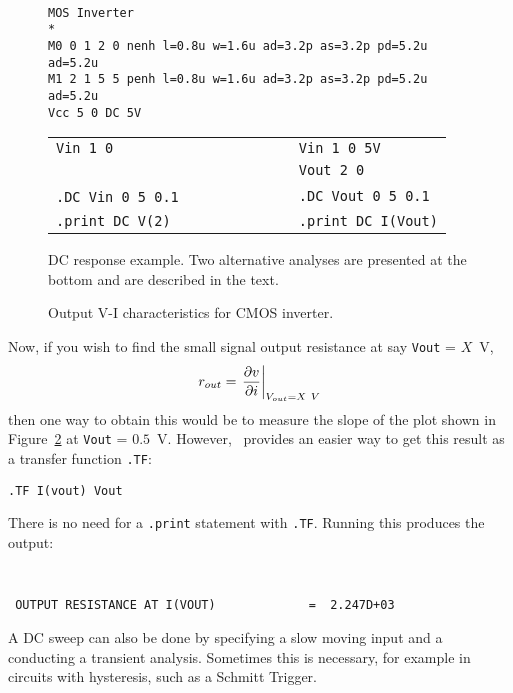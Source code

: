 \begin{figure}
\begin{center}
\par\noindent
{}
\par\noindent
{\tt
\begin{verbatim}
MOS Inverter
*
M0 0 1 2 0 nenh l=0.8u w=1.6u ad=3.2p as=3.2p pd=5.2u ad=5.2u
M1 2 1 5 5 penh l=0.8u w=1.6u ad=3.2p as=3.2p pd=5.2u ad=5.2u
Vcc 5 0 DC 5V
\end{verbatim} }
\par\noindent
\begin{tabular}{ll}
{\tt Vin 1 0 }      & {\tt Vin 1 0 5V} \\
                    & {\tt Vout 2 0 } \\
{\tt .DC Vin 0 5 0.1}\ \ \ \ \ \ \ \ \ \ \ \ \  & {\tt .DC Vout 0 5 0.1} \\
{\tt .print DC V(2)} & {\tt .print DC I(Vout)}
\end{tabular}
\end{center}
\caption{DC response example.
Two alternative analyses are presented at the bottom and are described
in the text.}
\label{fig:DC}
\end{figure}

%
\begin{figure}
\centerline{\epsfxsize=4in}
\caption{Output V-I characteristics for CMOS inverter.}
\label{VI-out}
\end{figure}
Now, if you wish to find the small signal output resistance at say {\tt Vout} =
$X$~V,
\[
  r_{out} = \left. {\partial v\over \partial i}\right|_{V_{out}=X\ V}
\]
then one way to obtain this would be to measure the slope of the plot shown
in Figure~\ref{VI-out} at {\tt Vout} = $0.5$~V.  However, \spice\ provides an
easier way to get this result as a transfer function {\tt .TF}:
\begin{center}
{\tt .TF I(vout) Vout}
\end{center}
There is no need for a {\tt .print} statement with {\tt .TF}.
Running this produces the output:
\begin{center}
{\tt
\begin{verbatim}
 OUTPUT RESISTANCE AT I(VOUT)             =  2.247D+03
\end{verbatim}
}
\end{center}

A DC sweep can also be done by specifying a slow moving input and a
conducting a transient analysis.
Sometimes this is necessary, for example in circuits
with hysteresis, such as a Schmitt Trigger.


